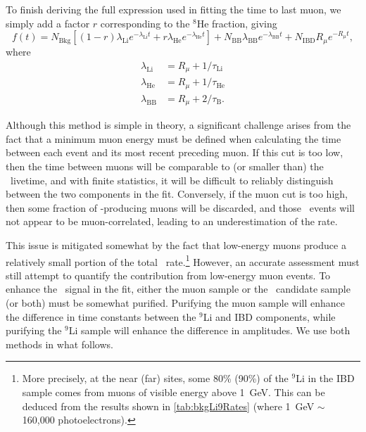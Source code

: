 \documentclass[../thesis.tex]{subfiles}
\begin{document}
To finish deriving the full expression used in fitting the time to last muon, we simply add a factor $r$ corresponding to the $^8$He fraction, giving
\begin{equation}
  \label{eq:bkgLi9FullExpr}
  f(t) = N_{\mathrm{Bkg}} \left[ (1-r)\lambda_{\mathrm{Li}} e^{-\lambda_{\mathrm{Li}} t} + r\lambda_{\mathrm{He}} e^{-\lambda_{\mathrm{He}} t }\right] + N_{\mathrm{BB}} \lambda_{\mathrm{BB}} e^{-\lambda_{\mathrm{BB}} t} + N_{\mathrm{IBD}} R_\mu e^{-R_\mu t},
\end{equation}
where
\begin{align*}
  \lambda_{\mathrm{Li}} &= R_\mu + 1/\tau_{\mathrm{Li}} \\
  \lambda_{\mathrm{He}} &= R_\mu + 1/\tau_{\mathrm{He}} \\
  \lambda_{\mathrm{BB}} &= R_\mu + 2/\tau_{\mathrm{B}}.
\end{align*}

Although this method is simple in theory, a significant challenge arises from the fact that a minimum muon energy must be defined when calculating the time between each event and its most recent preceding muon. If this cut is too low, then the time between muons will be comparable to (or smaller than) the \linine\ livetime, and with finite statistics, it will be difficult to reliably distinguish between the two components in the fit. Conversely, if the muon cut is too high, then some fraction of \linine-producing muons will be discarded, and those \linine\ events will not appear to be muon-correlated, leading to an underestimation of the rate.

This issue is mitigated somewhat by the fact that low-energy muons produce a relatively small portion of the total \linine\ rate.\footnote{More precisely, at the near (far) sites, some 80\% (90\%) of the $^9$Li in the IBD sample comes from muons of visible energy above 1~GeV. This can be deduced from the results shown in \autoref{tab:bkgLi9Rates} (where 1~GeV $\sim$ 160,000 photoelectrons).}
However, an accurate assessment must still attempt to quantify the contribution from low-energy muon events. To enhance the \linine\ signal in the fit, either the muon sample or the \linine\ candidate sample (or both) must be somewhat purified. Purifying the muon sample will enhance the difference in time constants between the $^9$Li and IBD components, while purifying the $^9$Li sample will enhance the difference in amplitudes. We use both methods in what follows.
\end{document}
